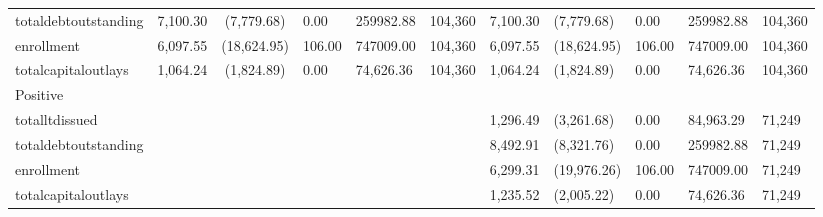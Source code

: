 \begin{table}[htbp]
\begin{tabular}{l*{2}{S}}
totaldebtoutstanding&    7,100.30&  (7,779.68)&        0.00&   259982.88&     104,360&    7,100.30&  (7,779.68)&        0.00&   259982.88&     104,360\\
enrollment          &    6,097.55& (18,624.95)&      106.00&   747009.00&     104,360&    6,097.55& (18,624.95)&      106.00&   747009.00&     104,360\\
totalcapitaloutlays &    1,064.24&  (1,824.89)&        0.00&   74,626.36&     104,360&    1,064.24&  (1,824.89)&        0.00&   74,626.36&     104,360\\
\midrule
Positive            &            &            &            &            &            &            &            &            &            &            \\
totalltdissued      &            &            &            &            &            &    1,296.49&  (3,261.68)&        0.00&   84,963.29&      71,249\\
totaldebtoutstanding&            &            &            &            &            &    8,492.91&  (8,321.76)&        0.00&   259982.88&      71,249\\
enrollment          &            &            &            &            &            &    6,299.31& (19,976.26)&      106.00&   747009.00&      71,249\\
totalcapitaloutlays &            &            &            &            &            &    1,235.52&  (2,005.22)&        0.00&   74,626.36&      71,249\\
\bottomrule
\end{tabular}
\end{table}
